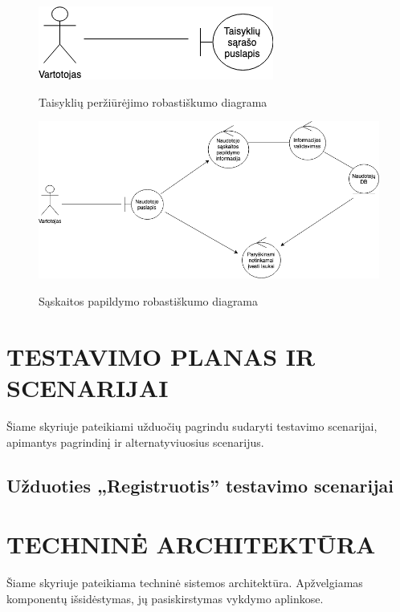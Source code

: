 \documentclass{VUMIFPSkursinis}
\begin{document}
		\begin{figure}[H]
		\centering
		\includegraphics[width=\linewidth]{img/taisykles.png}
		\label{fig:taisykles}
		\caption{Taisyklių peržiūrėjimo robastiškumo diagrama}
	\end{figure}

		\begin{figure}[H]
		\centering
		\includegraphics[width=\linewidth]{img/saskaita.png}
		\label{fig:sask}
		\caption{Sąskaitos papildymo robastiškumo diagrama}
	\end{figure}

	\newpage
	
	\section{TESTAVIMO PLANAS IR SCENARIJAI}	
	Šiame skyriuje pateikiami užduočių pagrindu sudaryti testavimo scenarijai, apimantys pagrindinį ir alternatyviuosius scenarijus.
	
	\subsection{Užduoties „Registruotis” testavimo scenarijai}
	\newpage
	
	\section{TECHNINĖ ARCHITEKTŪRA}
	Šiame skyriuje pateikiama techninė sistemos architektūra. Apžvelgiamas komponentų išsidėstymas, jų pasiskirstymas vykdymo aplinkose.
\end{document}
